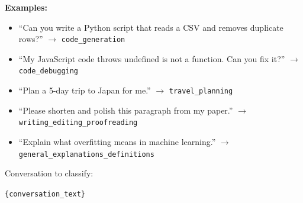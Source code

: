 \documentclass{article}
\begin{document}
\begin{tcolorbox}
\textbf{Examples:}
\begin{itemize}
    \item ``Can you write a Python script that reads a CSV and removes duplicate rows?'' $\rightarrow$ \texttt{code\_generation}
    \item ``My JavaScript code throws undefined is not a function. Can you fix it?'' $\rightarrow$ \texttt{code\_debugging}
    \item ``Plan a 5-day trip to Japan for me.'' $\rightarrow$ \texttt{travel\_planning}
    \item ``Please shorten and polish this paragraph from my paper.'' $\rightarrow$ \texttt{writing\_editing\_proofreading}
    \item ``Explain what overfitting means in machine learning.'' $\rightarrow$ \texttt{general\_explanations\_definitions}
\end{itemize}

Conversation to classify:

\texttt{\{conversation\_text\}}
\end{tcolorbox}
\end{document}

